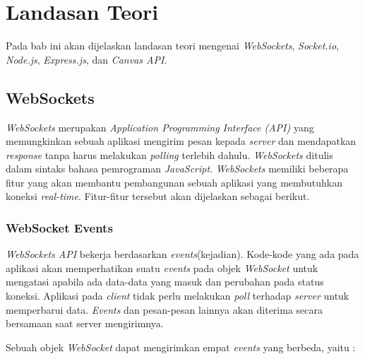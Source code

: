 \chapter{Landasan Teori}
\label{chap:teori}

Pada bab ini akan dijelaskan landasan teori mengenai \textit{WebSockets}, \textit{Socket.io}, \textit{Node.js}, \textit{Express.js}, dan \textit{Canvas API}.

\section{WebSockets}
\label{sec:WebSockets} 

\textit{WebSockets} merupakan \textit{Application Programming Interface (API)} yang memungkinkan sebuah aplikasi mengirim pesan kepada \textit{server} dan mendapatkan \textit{response} tanpa harus melakukan \textit{polling} terlebih dahulu. \textit{WebSockets} ditulis dalam sintaks bahasa pemrograman \textit{JavaScript}. \textit{WebSockets} memiliki beberapa fitur yang akan membantu pembangunan sebuah aplikasi yang membutuhkan koneksi \textit{real-time}. Fitur-fitur tersebut akan dijelaskan sebagai berikut.

\subsection{WebSocket Events}

\textit{WebSockets API} bekerja berdasarkan \textit{events}(kejadian). Kode-kode yang ada pada aplikasi akan memperhatikan suatu \textit{events} pada objek \textit{WebSocket} untuk mengatasi apabila ada data-data yang masuk dan perubahan pada status koneksi. Aplikasi pada \textit{client} tidak perlu melakukan \textit{poll} terhadap \textit{server} untuk memperbarui data. \textit{Events} dan pesan-pesan lainnya akan diterima secara bersamaan saat server mengirimnya.

Sebuah objek \textit{WebSocket} dapat mengirimkan empat \textit{events} yang berbeda, yaitu : 
	
